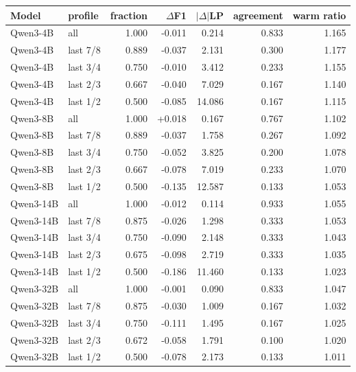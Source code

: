 \begin{tabular}{llrrrrr}
\toprule
Model & profile & fraction & $\Delta$F1 & $|\Delta|$LP & agreement & warm ratio \\
\midrule
Qwen3-4B & all & 1.000 & -0.011 & 0.214 & 0.833 & 1.165 \\
Qwen3-4B & last 7/8 & 0.889 & -0.037 & 2.131 & 0.300 & 1.177 \\
Qwen3-4B & last 3/4 & 0.750 & -0.010 & 3.412 & 0.233 & 1.155 \\
Qwen3-4B & last 2/3 & 0.667 & -0.040 & 7.029 & 0.167 & 1.140 \\
Qwen3-4B & last 1/2 & 0.500 & -0.085 & 14.086 & 0.167 & 1.115 \\
Qwen3-8B & all & 1.000 & +0.018 & 0.167 & 0.767 & 1.102 \\
Qwen3-8B & last 7/8 & 0.889 & -0.037 & 1.758 & 0.267 & 1.092 \\
Qwen3-8B & last 3/4 & 0.750 & -0.052 & 3.825 & 0.200 & 1.078 \\
Qwen3-8B & last 2/3 & 0.667 & -0.078 & 7.019 & 0.233 & 1.070 \\
Qwen3-8B & last 1/2 & 0.500 & -0.135 & 12.587 & 0.133 & 1.053 \\
Qwen3-14B & all & 1.000 & -0.012 & 0.114 & 0.933 & 1.055 \\
Qwen3-14B & last 7/8 & 0.875 & -0.026 & 1.298 & 0.333 & 1.053 \\
Qwen3-14B & last 3/4 & 0.750 & -0.090 & 2.148 & 0.333 & 1.043 \\
Qwen3-14B & last 2/3 & 0.675 & -0.098 & 2.719 & 0.333 & 1.035 \\
Qwen3-14B & last 1/2 & 0.500 & -0.186 & 11.460 & 0.133 & 1.023 \\
Qwen3-32B & all & 1.000 & -0.001 & 0.090 & 0.833 & 1.047 \\
Qwen3-32B & last 7/8 & 0.875 & -0.030 & 1.009 & 0.167 & 1.032 \\
Qwen3-32B & last 3/4 & 0.750 & -0.111 & 1.495 & 0.167 & 1.025 \\
Qwen3-32B & last 2/3 & 0.672 & -0.058 & 1.791 & 0.100 & 1.020 \\
Qwen3-32B & last 1/2 & 0.500 & -0.078 & 2.173 & 0.133 & 1.011 \\
\bottomrule
\end{tabular}
